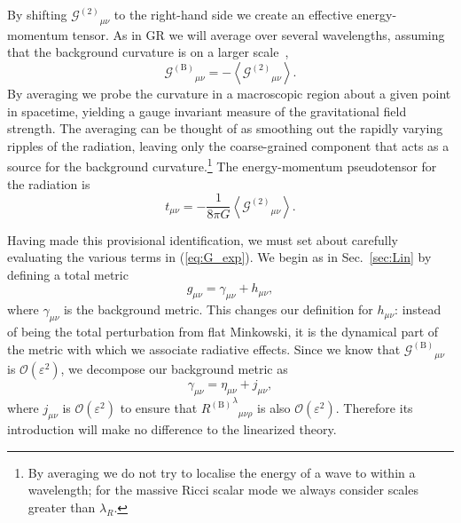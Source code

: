 \documentclass[aps,prd,amsfonts,amssymb,amsmath,nofootinbib,reprint,showpacs]{revtex4-1}
\newcommand{\eqnref}[1]{(\ref{eq:#1})}
\newcommand{\secref}[1]{Sec.\ \ref{sec:#1}}
\newcommand{\recip}[1]{\ensuremath{\frac{1}{#1}}}
\newcommand{\order}[1]{\ensuremath{\mathcal{O}({#1})}}
\begin{document}
By shifting ${\mathcal{G}^{(2)}}_{\mu\nu}$ to the right-hand side we create an effective energy-momentum tensor. As in GR we will average over several wavelengths, assuming that the background curvature is on a larger scale~\cite{Misner1973},
\begin{equation}
{\mathcal{G}^{(\text{B})}}_{\mu\nu} = -\left\langle{\mathcal{G}^{(2)}}_{\mu\nu}\right\rangle.
\end{equation}
By averaging we probe the curvature in a macroscopic region about a given point in spacetime, yielding a gauge invariant measure of the gravitational field strength. The averaging can be thought of as smoothing out the rapidly varying ripples of the radiation, leaving only the coarse-grained component that acts as a source for the background curvature.\footnote{By averaging we do not try to localise the energy of a wave to within a wavelength; for the massive Ricci scalar mode we always consider scales greater than $\lambda_R$.} The energy-momentum pseudotensor for the radiation is
\begin{equation}
t_{\mu\nu} = -\recip{8\pi G}\left\langle{\mathcal{G}^{(\text{2})}}_{\mu\nu}\right\rangle.
\end{equation}

Having made this provisional identification, we must set about carefully evaluating the various terms in \eqnref{G_exp}. We begin as in \secref{Lin} by defining a total metric
\begin{equation}
g_{\mu\nu} = \gamma_{\mu\nu} + h_{\mu\nu},
\end{equation}
where $\gamma_{\mu\nu}$ is the background metric. This changes our definition for $h_{\mu\nu}$: instead of being the total perturbation from flat Minkowski, it is the dynamical part of the metric with which we associate radiative effects. Since we know that ${\mathcal{G}^{(\text{B})}}_{\mu\nu}$ is $\order{\varepsilon^2}$, we decompose our background metric as
\begin{equation}
\gamma_{\mu\nu} = \eta_{\mu\nu} + j_{\mu\nu},
\end{equation}
where $j_{\mu\nu}$ is $\order{\varepsilon^2}$ to ensure that ${{R^{(\text{B})}}^\lambda}_{\mu\nu\rho}$ is also $\order{\varepsilon^2}$. Therefore its introduction will make no difference to the linearized theory.
\end{document}
